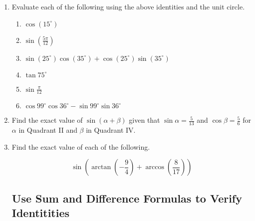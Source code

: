 \begin{enumerate}
\vspace{-.1in}
\item Evaluate each of the following using the above identities and the unit circle.


\begin{enumerate}
\item $\cos\left(15^{\circ}\right)$
\vfill

\item $\sin\left(\frac{5\pi}{12}\right)$
\vfill

\newpage

\item $\sin\left(25^{\circ}\right)\cos\left(35^{\circ}\right) +\cos\left(25^{\circ}\right)\sin\left(35^{\circ}\right)$
\vfill

\item $\tan 75^{\circ}$
\vfill

\item $\sin \frac{\pi}{12}$
\vfill
 
\item $\cos 99^{\circ}\cos 36^{\circ}-\sin 99^{\circ}\sin 36^{\circ}$
\vfill

\end{enumerate}

\newpage



\item Find the exact value of $\sin (\alpha + \beta)$ given that $\sin \alpha = \frac{5}{13}$ and $\cos \beta = \frac{5}{6}$ for $\alpha$ in Quadrant II and $\beta$ in Quadrant IV.
\vfill



\item Find the exact value of each of the following.

$$\sin \left( \arctan \left(-\frac{9}{4}\right)+\arccos \left(\frac{8}{17}\right)\right)$$
\vfill



\newpage

\subsection{Use Sum and Difference Formulas to Verify Identitities} ~


\end{enumerate}
